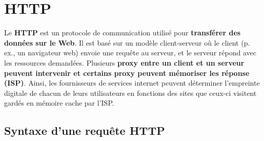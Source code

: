\documentclass[a4paper]{report}
\begin{document}
    \section{HTTP}


    \begin{Concept}
        Le \textbf{HTTP}  est un protocole 
        de communication utilisé pour \textbf{transférer des données sur le Web}. Il est 
        basé sur un modèle client-serveur où le client (p. ex., un navigateur 
        web) envoie une requête au serveur, et le serveur répond avec les 
        ressources demandées. Plusieurs \textbf{proxy entre un client et un serveur peuvent intervenir et certains proxy peuvent mémoriser les réponse (ISP)}. Ainsi, les fournisseurs 
        de services internet peuvent déterminer l'empreinte digitale de chacun
        de leurs utilisateurs en fonctions des sites que ceux-ci visitent 
        gardés en mémoire cache par l'ISP. 
    \end{Concept}

    \begin{center}
    \end{center}


    \subsection{Syntaxe d'une requête HTTP}

    \normalfont
\end{document}
